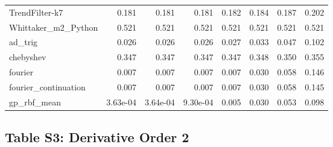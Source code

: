 \begin{longtable}{lrrrrrrr}
TrendFilter-k7 & 0.181 & 0.181 & 0.181 & 0.182 & 0.184 & 0.187 & 0.202 \\
Whittaker\_m2\_Python & 0.521 & 0.521 & 0.521 & 0.521 & 0.521 & 0.521 & 0.521 \\
ad\_trig & 0.026 & 0.026 & 0.026 & 0.027 & 0.033 & 0.047 & 0.102 \\
chebyshev & 0.347 & 0.347 & 0.347 & 0.347 & 0.348 & 0.350 & 0.355 \\
fourier & 0.007 & 0.007 & 0.007 & 0.007 & 0.030 & 0.058 & 0.146 \\
fourier\_continuation & 0.007 & 0.007 & 0.007 & 0.007 & 0.030 & 0.058 & 0.145 \\
gp\_rbf\_mean & 3.63e-04 & 3.64e-04 & 9.30e-04 & 0.005 & 0.030 & 0.053 & 0.098 \\
\bottomrule
\end{longtable}

\clearpage

\subsection*{Table S3: Derivative Order 2}

